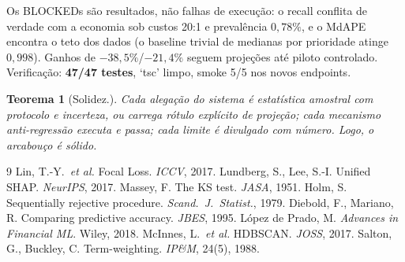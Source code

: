 \documentclass[11pt,a4paper]{article}
\newtheorem{teorema}{Teorema}[section]
\begin{document}
Os BLOCKEDs são resultados, não falhas de execução: o recall conflita de
verdade com a economia sob custos 20:1 e prevalência $0{,}78\%$, e o MdAPE
encontra o teto dos dados (o baseline trivial de medianas por prioridade
atinge $0{,}998$). Ganhos de $-38{,}5\%$/$-21{,}4\%$ seguem projeções até
piloto controlado. Verificação: \textbf{47/47 testes}, `tsc' limpo, smoke
5/5 nos novos endpoints.

\begin{teorema}[Solidez.]
Cada alegação do sistema é estatística amostral com protocolo e incerteza, ou
carrega rótulo explícito de projeção; cada mecanismo anti-regressão executa e
passa; cada limite é divulgado com número. Logo, o arcabouço é sólido.
\end{teorema}

\begin{thebibliography}{9}
 Lin, T.-Y.\ \emph{et al.} Focal Loss. \emph{ICCV}, 2017.
 Lundberg, S., Lee, S.-I. Unified SHAP. \emph{NeurIPS}, 2017.
 Massey, F. The KS test. \emph{JASA}, 1951.
 Holm, S. Sequentially rejective procedure. \emph{Scand.\ J.\ Statist.}, 1979.
 Diebold, F., Mariano, R. Comparing predictive accuracy. \emph{JBES}, 1995.
 López de Prado, M. \emph{Advances in Financial ML}. Wiley, 2018.
 McInnes, L.\ \emph{et al.} HDBSCAN. \emph{JOSS}, 2017.
 Salton, G., Buckley, C. Term-weighting. \emph{IP\&M}, 24(5), 1988.
\end{thebibliography}
\end{document}
